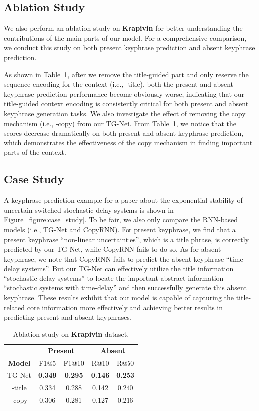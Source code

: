 \documentclass[letterpaper]{article} %
\begin{document}
\subsection{Ablation Study}
We also perform an ablation study on \textbf{Krapivin} for better understanding the contributions of the main parts of our model. For a comprehensive comparison, we conduct this study on both present keyphrase prediction and absent keyphrase prediction. 

As shown in Table~\ref{table:ablation study}, after we remove the title-guided part and only reserve the sequence encoding for the context (i.e., -title), both the present and absent keyphrase prediction performance become obviously worse, indicating that our title-guided context encoding is consistently critical for both present and absent keyphrase generation tasks. We also investigate the effect of removing the copy mechanism (i.e., -copy) from our TG-Net. From Table~\ref{table:ablation study}, we notice that the scores decrease dramatically on both present and absent keyphrase prediction, which demonstrates the effectiveness of the copy mechanism in finding important parts of the context.


\subsection{Case Study}
A keyphrase prediction example for a paper about the exponential stability of uncertain switched stochastic delay systems is shown in Figure~\ref{figure:case_study}. To be fair, we also only compare the RNN-based models (i.e., TG-Net and CopyRNN). For present keyphrase, we find that a present keyphrase ``non-linear uncertainties'', which is a title phrase, is correctly predicted by our TG-Net, while CopyRNN fails to do so. As for absent keyphrase, we note that CopyRNN fails to predict the absent keyphrase ``time-delay systems''. But our TG-Net can effectively utilize the title information ``stochastic delay systems'' to locate the important abstract information ``stochastic systems with time-delay'' and then successfully generate this absent keyphrase. These results exhibit that our model is capable of capturing the title-related core information more effectively and achieving better results in predicting present and absent keyphrases.


\begin{table}[t]
\centering
\begin{tabular}{c| c c| c c}
  \hline
  \hline
  & \multicolumn{2}{c|}{\textbf{Present}} & \multicolumn{2}{c}{\textbf{Absent}}
  \\
  \textbf{Model} & F1@5 & F1@10 & R@10 & R@50
  \\
  \hline
  \hline
  TG-Net & \textbf{0.349} & \textbf{0.295} & \textbf{0.146} & \textbf{0.253}\\
  \hline
 -title & 0.334 & 0.288 & 0.142 & 0.240\\
  \hline
 -copy & 0.306 & 0.281 & 0.127 & 0.216\\
  \hline
\end{tabular}
\caption{Ablation study on \textbf{Krapivin} dataset.}
\label{table:ablation study}
\end{table}
\end{document}
